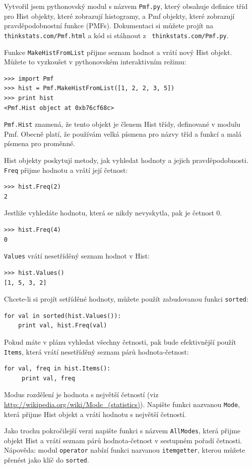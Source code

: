 \documentclass[12pt]{book}
\begin{document}
Vytvořil jsem pythonovský modul s názvem {\tt Pmf.py}, který obsahuje definice tříd pro Hist objekty, které zobrazují histogramy, a Pmf objekty, které zobrazují pravděpodobnostní funkce (PMFs).  Dokumentaci si můžete projít na {\tt
  thinkstats.com/Pmf.html} a kód si stáhnout z {\tt
  thinkstats.com/Pmf.py}.

Funkce {\tt MakeHistFromList} přijme seznam hodnot a vrátí nový Hist objekt.
 Můžete to vyzkoušet v pythonovském interaktivním režimu:
%
\begin{verbatim}
>>> import Pmf
>>> hist = Pmf.MakeHistFromList([1, 2, 2, 3, 5])
>>> print hist
<Pmf.Hist object at 0xb76cf68c>
\end{verbatim}

{\tt Pmf.Hist} znamená, že tento objekt je členem Hist třídy, definované v modulu Pmf.
Obecně platí, že používám velká písmena pro názvy tříd a funkcí a malá písmena pro proměnné.

Hist objekty poskytují metody, jak vyhledat hodnoty a jejich pravděpodobnosti.  {\tt Freq} přijme hodnotu a vrátí její četnost:
%
\begin{verbatim}
>>> hist.Freq(2)
2
\end{verbatim}

Jestliže vyhledáte hodnotu, která se nikdy nevyskytla, pak je četnost 0.
%
\begin{verbatim}
>>> hist.Freq(4)
0
\end{verbatim}

{\tt Values} vrátí nesetříděný seznam hodnot v Hist:
%
\begin{verbatim}
>>> hist.Values()
[1, 5, 3, 2]
\end{verbatim}

Chcete-li si projít setříděné hodnoty, můžete použít zabudovanou funkci
{\tt sorted}:
%
\begin{verbatim}
for val in sorted(hist.Values()):
    print val, hist.Freq(val)
\end{verbatim}

Pokud máte v plánu vyhledat všechny četnosti, pak bude efektivnější použít {\tt Items}, která vrátí nesetříděný seznam párů hodnota-četnost:
%
\begin{verbatim}
for val, freq in hist.Items():
     print val, freq
\end{verbatim}

\begin{exercise}
Modus rozdělení je hodnota s největší četností (viz
\url{http://wikipedia.org/wiki/Mode_(statistics)}). Napište funkci nazvanou
 {\tt Mode}, která přijme Hist objekt a vrátí hodnotu s největší četností.

Jako trochu pokročilejší verzi napište funkci s názvem {\tt AllModes}, která přijme objekt Hist a vrátí seznam párů hodnota-četnost v sestupném pořadí četnosti. Nápověda: modul {\tt operator}
nabízí funkci nazvanou {\tt itemgetter}, kterou můžete přenést jako klíč do {\tt sorted}.

\end{exercise}
\end{document}
